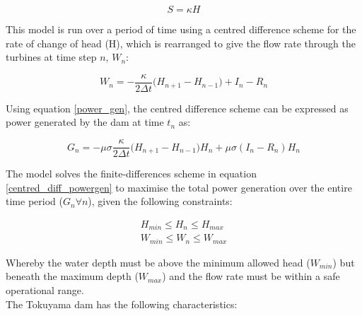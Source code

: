 \documentclass[11pt]{article}
\begin{document}
\begin{equation}
    S = \kappa H
    \label{volume_head}
\end{equation}

This model is run over a period of time using a centred difference scheme for the rate of change of head (H), which is rearranged to give the flow rate through the turbines at time step $n$, $W_n$:

\begin{equation}
    W_n = - \frac{\kappa}{2 \Delta t} \biggl( H_{n+1} - H_{n-1} \biggr) + I_n - R_n
    \label{centred_diff_flowrate}
\end{equation}

Using equation \ref{power_gen}, the centred difference scheme can be expressed as power generated by the dam at time $t_n$ as:

\begin{equation}
    G_n = - \mu \sigma \frac{\kappa}{2 \Delta t} \biggl( H_{n+1} - H_{n-1} \biggr)H_n + \mu \sigma(I_n - R_n) H_n
    \label{centred_diff_powergen}
\end{equation}

The model solves the finite-differences scheme in equation \ref{centred_diff_powergen} to maximise the total power generation over the entire time period ($G_n \forall n$), given the following constraints:

\begin{align*}
    H_{min} \leq H_n \leq H_{max} \\
    W_{min} \leq W_n \leq W_{max}
    \label{constraints_H_W}
\end{align*}

Whereby the water depth must be above the minimum allowed head ($W_{min}$) but beneath the maximum depth ($W_{max}$) and the flow rate must be within a safe operational range.\\

The Tokuyama dam has the following characteristics:\\
\end{document}
